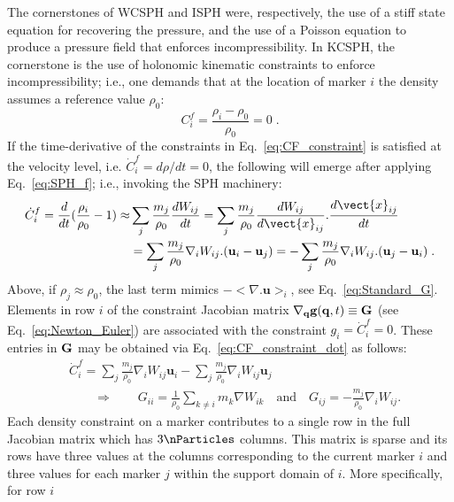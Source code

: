 The cornerstones of WCSPH and ISPH were, respectively, the use of a stiff state equation for recovering the pressure, and the use of a Poisson equation to produce a pressure field that enforces incompressibility. In KCSPH, the cornerstone is the use of holonomic kinematic constraints to enforce incompressibility; i.e., one demands that at the location of marker $i$ the density assumes a reference value $\rho_0$:
\begin{equation} \label{eq:CF_constraint}
C^f_i = \frac{\rho_i-\rho_0}{\rho_0} = 0\;.
\end{equation}
\noindent If the time-derivative of the constraints in Eq.~\ref{eq:CF_constraint} is satisfied at the velocity level, i.e.  $\dot{C}^f_i=d\rho/dt=0$, the following will emerge after applying Eq.~\ref{eq:SPH_f}; i.e., invoking the SPH machinery:
\begin{align} \label{eq:CF_constraint_dot}
\dot{C}^f_i =  \frac{d}{dt}(\frac{\rho_i}{\rho_0} -1) \approx &  \sum_j \frac{m_j}{\rho_0} \frac{dW_{ij}}{dt} =  \sum_j \frac{m_j}{\rho_0} \frac{d W_{ij}}{d \vect{x}_{ij}}. \frac{d \vect{x}_{ij}}{dt} \nonumber\\
&=\sum_j \frac{m_j}{\rho_0} \nabla_i W_{ij}. (\textbf{u}_i-\textbf{u}_j) = - \sum_j \frac{m_j}{\rho_0} \nabla_i W_{ij}. (\textbf{u}_j-\textbf{u}_i) \; .
\end{align}
\noindent
Above, if $\rho_j\approx \rho_0$, the last term mimics $- <\nabla. \textbf{u}>_i$, see Eq.~\ref{eq:Standard_G}. Elements in row $i$ of the constraint Jacobian matrix $\nabla_{\bf q} {\bf g}({\bf q},t)\equiv {\bf G}$ (see Eq.~\ref{eq:Newton_Euler}) are associated with the constraint $ g_i=\dot{C}^f_i=0$. These entries in ${\bf G}$ may be obtained via Eq.~\ref{eq:CF_constraint_dot} as follows:
\begin{align} \label{eq:CF_constraint_Jac}
&\dot{C}^f_i =  \sum_j \frac{m_j}{\rho_0} \nabla_i W_{ij} \textbf{u}_i - \sum_j \frac{m_j}{\rho_0} \nabla_i W_{ij} \textbf{u}_j \; \nonumber\\
& \qquad \Rightarrow \qquad
{G}_{ii} = \frac{1}{\rho_0}\sum_{k \ne i} m_k \nabla W_{ik} \quad \mbox{and} \quad 
{G}_{ij} =-\frac{m_j}{\rho_0}\nabla_i W_{ij}.
\end{align}
\noindent
Each density constraint on a marker contributes to a single row in the full Jacobian matrix which has $3\nParticles$ columns. This matrix is sparse and its rows have three values at the columns corresponding to the current marker $i$ and three values for each marker $j$ within the support domain of $i$. More specifically, for row $i$
